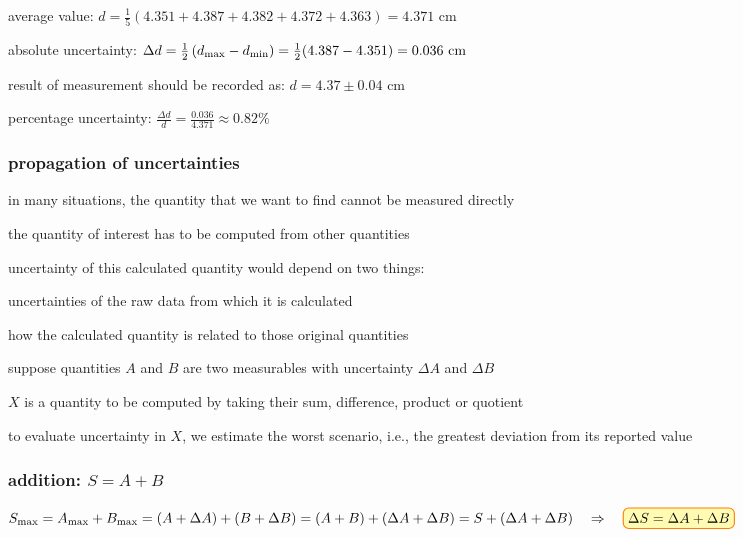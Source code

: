 
\sol average value: $d = \frac{1}{5}(4.351+4.387+4.382+4.372+4.363) = 4.371 \text{ cm}$

absolute uncertainty: $\Delta d = \frac{1}{2}\left(d_{\text{max}}-d_{\text{min}}\right) = \frac{1}{2}(4.387-4.351) = 0.036 \text{ cm}$

result of measurement should be recorded as: $ d = 4.37 \pm 0.04 \text{ cm}$

percentage uncertainty: $\frac{\Delta d}{d} = \frac{0.036}{4.371} \approx 0.82\%$   \eoe




\subsubsection{propagation of uncertainties}

in many situations, the quantity that we want to find cannot be measured directly

the quantity of interest has to be computed from other quantities

uncertainty of this calculated quantity would depend on two things:

\titem uncertainties of the raw data from which it is calculated

\titem how the calculated quantity is related to those original quantities

\vspace*{\baselineskip}

suppose quantities $A$ and $B$ are two measurables with uncertainty $\Delta A$ and $\Delta B$ 

$X$ is a quantity to be computed by taking their sum, difference, product or quotient

to evaluate uncertainty in $X$, we estimate the worst scenario, i.e., the greatest deviation from its reported value

\subsubsection*{addition: $S=A+B$}

$S_\tmax = A_\tmax + B_\tmax = (A + \Delta A) + (B + \Delta B) = (A+B) + (\Delta A + \Delta B)= S + (\Delta A + \Delta B) \RA \boxed{\Delta S = \Delta A + \Delta B}$

